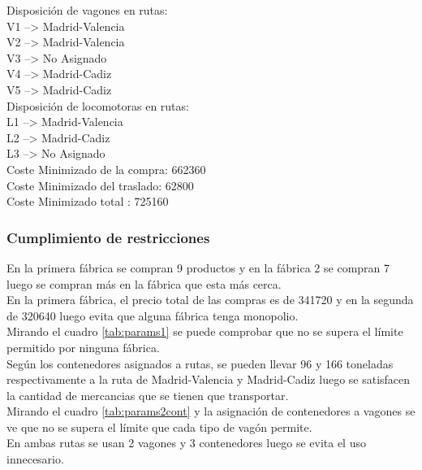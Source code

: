 \documentclass[11pt,spanish]{article}
\begin{document}
\begin{tabbing}
		Disposición de vagones en rutas:\\
		\>	V1 --> Madrid-Valencia\\
		\>	V2 --> Madrid-Valencia\\
		\>	V3 --> No Asignado\\
		\>	V4 --> Madrid-Cadiz\\
		\>	V5 --> Madrid-Cadiz\\
		Disposición de locomotoras en rutas:\\
		\>	L1 --> Madrid-Valencia\\
		\>	L2 --> Madrid-Cadiz\\
		\>	L3 --> No Asignado\\
		Coste Minimizado de la compra: 662360\\
		Coste Minimizado del traslado: 62800\\
		Coste Minimizado total       : 725160\\
		\end{tabbing}
			\subsubsection{Cumplimiento de restricciones}
			En la primera fábrica se compran 9 productos y en la fábrica 2 se compran 7 luego se compran más en la fábrica que esta más cerca.\\
			En la primera fábrica, el precio total de las compras es de 341720 y en la segunda de 320640 luego evita que alguna fábrica tenga monopolio.\\
			Mirando el cuadro \ref{tab:params1} se puede comprobar que no se supera el límite permitido por ninguna fábrica.\\
			Según los contenedores asignados a rutas, se pueden llevar 96 y 166 toneladas respectivamente a la ruta de Madrid-Valencia y Madrid-Cadiz luego se satisfacen la cantidad de mercancias que se tienen que transportar.\\
			Mirando el cuadro \ref{tab:params2cont} y la asignación de contenedores a vagones se ve que no se supera el límite que cada tipo de vagón permite.\\
			En ambas rutas se usan 2 vagones y 3 contenedores luego se evita el uso innecesario.
\end{document}

